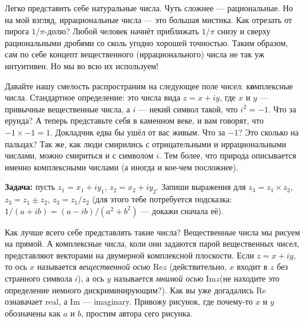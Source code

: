 \documentclass[12pt]{article}
\begin{document}
Легко представить себе натуральные числа. Чуть сложнее --- рациональные. Но на мой взгляд, иррациональные числа --- это большая мистика. Как отрезать от пирога $1 / \pi$-долю? Любой человек начнёт приближать $1 / \pi$ снизу и сверху рациональными дробями со сколь угодно хорошей точностью. Таким образом, сам по себе концепт вещественного (иррационального) числа не так уж интуитивен. Но мы во всю их используем!

Давайте нашу смелость распространим на следующее поле чисел: к{\bf о}мплексные числа. Стандартное определение: это числа вида $z = x + i y$, где $x$ и $y$ --- привычные вещественные числа, а $i$ --- некий символ такой, что $\boxed{i^2 = -1}$. Что за ерунда? А теперь представьте себя в каменном веке, и вам говорят, что $-1 \times -1 = 1$. Докладчик едва бы ушёл от вас живым. Что за $-1$? Это сколько на пальцах? Так же, как люди смирились с отрицательными и иррациональными числами, можно смириться и с символом $i$. Тем более, что природа описывается именно комплексными числами (а иногда и кое-чем посложнее).

{\bf Задача:} пусть $z_1 = x_1 + i y_1$, $z_2 = x_2 + i y_2$. Запиши выражения для $z_3 = z_1 \times z_2$, $z_3 = z_1 \pm z_2$, $z_3 = z_1 / z_2$ (для этого тебе потребуется подсказка: $1 / (a + i b) = (a - i b) / (a^2 + b^2)$ --- докажи сначала её).

Как лучше всего себе представлять такие числа? Вещественные числа мы рисуем на прямой. А комплексные числа, коли они задаются парой вещественных чисел, представляют векторами на двумерной комплексной плоскости. Если $z = x + i y$, то ось $x$ называется {\it вещественной осью} $\mbox{Re} z$ (действительно, $x$ входит в $z$ без странного символа $i$), а ось $y$ называется {\it мнимой осью} $\mbox{Im} z$(не находите это определение немного дискриминирующим?). Как вы уже догадались $\mbox{Re}$ ознавачает real, а $\mbox{Im}$ --- imaginary.
Привожу рисунок, где почему-то $x$ и $y$ обозначены как $a$ и $b$, простим автора сего рисунка.
\end{document}
